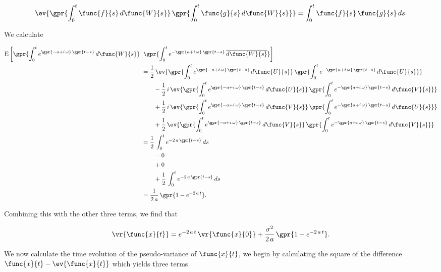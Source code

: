 \begin{equation}
	\ev{\gpr{\int_{0}^{t} \func{f}{s}\,d\func{W}{s}}\,\gpr{\int_{0}^{t} \func{g}{s}\,d\func{W}{s}}} = \int_{0}^{t} \func{f}{s}\,\func{g}{s}\,ds.
\end{equation}

We calculate

\begin{align}
	\text{E}\left[\gpr{\int_{0}^{t} e^{\gpr{-a + i\,\omega}\,\gpr{t - s}}\,d\func{W}{s}}\right.\,&\left.\gpr{\int_{0}^{t} e^{-\gpr{a + i\,\omega}\,\gpr{t - s}}\,\overline{d\func{W}{s}}}\right] \nonumber \\
			&= \frac{1}{2}\,\ev{\gpr{\int_{0}^{t} e^{\gpr{-a + i\,\omega}\,\gpr{t - s}}\,d\func{U}{s}}\,\gpr{\int_{0}^{t} e^{-\gpr{a + i\,\omega}\,\gpr{t - s}}\,d\func{U}{s}}} \nonumber \\
				&\qquad - \frac{1}{2}\,i\,\ev{\gpr{\int_{0}^{t} e^{\gpr{-a + i\,\omega}\,\gpr{t - s}}\,d\func{U}{s}}\,\gpr{\int_{0}^{t} e^{-\gpr{a + i\,\omega}\,\gpr{t - s}}\,d\func{V}{s}}} \nonumber \\
				&\qquad + \frac{1}{2}\,i\,\ev{\gpr{\int_{0}^{t} e^{\gpr{-a + i\,\omega}\,\gpr{t - s}}\,d\func{V}{s}}\,\gpr{\int_{0}^{t} e^{-\gpr{a + i\,\omega}\,\gpr{t - s}}\,d\func{U}{s}}} \nonumber \\
				&\qquad + \frac{1}{2}\,\ev{\gpr{\int_{0}^{t} e^{\gpr{-a + i\,\omega}\,\gpr{t - s}}\,d\func{V}{s}}\,\gpr{\int_{0}^{t} e^{-\gpr{a + i\,\omega}\,\gpr{t - s}}\,d\func{V}{s}}} \nonumber \\
			&= \frac{1}{2}\,\int_{0}^{t} e^{-2\,a\,\gpr{t - s}}\,ds \nonumber \\
				&\qquad - 0 \nonumber \\
				&\qquad + 0 \nonumber \\
				&\qquad + \frac{1}{2}\,\int_{0}^{t} e^{-2\,a\,\gpr{t - s}}\,ds \nonumber \\
			&= \frac{1}{2\,a}\,\gpr{1 - e^{-2\,a\,t}}.
\end{align}

Combining this with the other three terms, we find that

\begin{equation}
	\vr{\func{x}{t}} = e^{-2\,a\,t}\,\vr{\func{x}{0}} + \frac{\sigma^2}{2\,a}\,\gpr{1 - e^{-2\,a\,t}}.
\end{equation}

We now calculate the time evolution of the pseudo-variance of $\func{x}{t}$, we begin by calculating the square of the difference $\func{x}{t} - \ev{\func{x}{t}}$ which yields three terms

